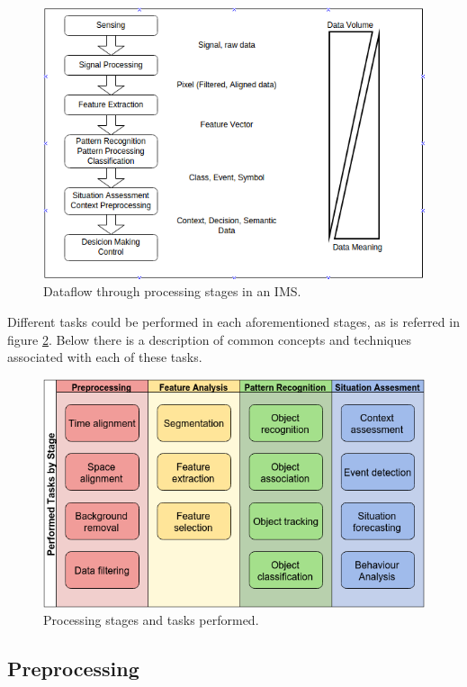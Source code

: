 \documentclass[10pt,twocolumn,letterpaper]{article}
\begin{document}
\begin{figure}[ht!]
\centering
\includegraphics[scale=0.35]{../fig/3/proc_stages.png}
\caption{Dataflow through processing stages in an IMS.}
\label{proc_stages}
\end{figure}

Different tasks could be performed in each aforementioned stages, as is referred in figure \ref{proc_stages_tasks}. Below there is a description of common concepts and techniques associated with each of these tasks.

\begin{figure}[ht!]
\centering
\includegraphics[scale=0.35]{../fig/3/processing_stages_and_tasks.png}
\caption{Processing stages and tasks performed.}
\label{proc_stages_tasks}
\end{figure}
\subsection{Preprocessing}
\end{document}
